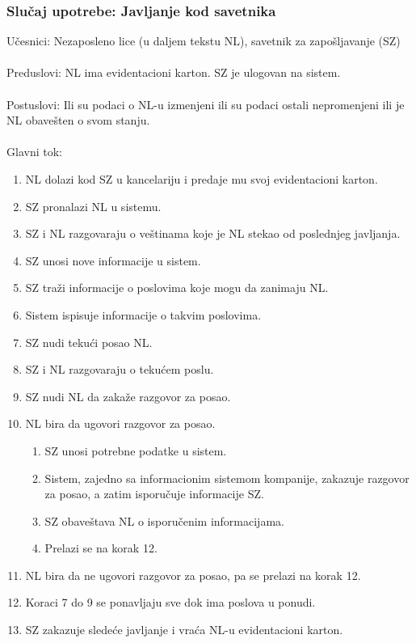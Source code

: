 \subsubsection{Slu\v caj upotrebe: Javljanje kod savetnika}
\label{su: javljanje kod savetnika}

\noindent U\v cesnici: Nezaposleno lice (u daljem tekstu NL), savetnik za zapo\v sljavanje (SZ)
\\
\\ Preduslovi: NL ima evidentacioni karton. SZ je ulogovan na sistem. 
\\
\\ Postuslovi: Ili su podaci o NL-u izmenjeni ili su podaci ostali nepromenjeni ili je NL obave\v sten o svom stanju.
\\ 
\\ Glavni tok:
\begin{enumerate}
	\item NL dolazi kod SZ u kancelariju i predaje mu svoj evidentacioni karton.
	\item SZ pronalazi NL u sistemu.
	\item SZ i NL razgovaraju o ve\v stinama koje je NL stekao od poslednjeg javljanja.
	\item SZ unosi nove informacije u sistem.
	\item SZ tra\v zi informacije o poslovima koje mogu da zanimaju NL.
	\item Sistem ispisuje informacije o takvim poslovima. 
	\item SZ nudi teku\' ci posao NL.
	\item SZ i NL razgovaraju o teku\' cem poslu.
	\item SZ nudi NL da zaka\v ze razgovor za posao.
	\item NL bira da ugovori razgovor za posao.
	\begin{enumerate}
		\item SZ unosi potrebne podatke u sistem.
		\item Sistem, zajedno sa informacionim sistemom kompanije, zakazuje razgovor za posao, a zatim isporu\v cuje informacije SZ.
		\item SZ obave\v stava NL o isporu\v cenim informacijama.
		\item Prelazi se na korak 12.
	\end{enumerate}
	\item NL bira da ne ugovori razgovor za posao, pa se prelazi na korak 12.
	\item Koraci 7 do 9 se ponavljaju sve dok ima poslova u ponudi.
	\item SZ zakazuje slede\' ce javljanje i vra\' ca NL-u evidentacioni karton.
\end{enumerate}


